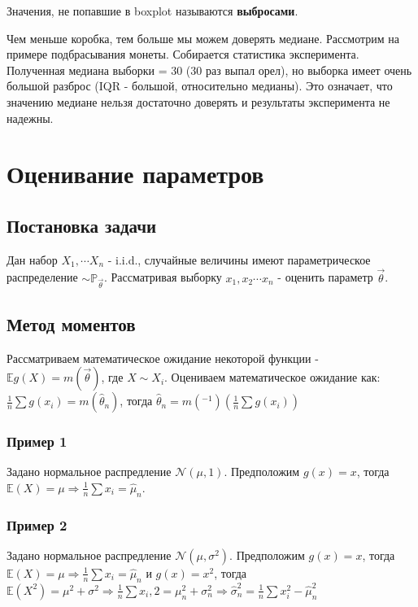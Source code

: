 \documentclass[a4 paper]{article}
\begin{document}
\begin{defin}
Значения, не попавшие в boxplot называются \textbf{выбросами}.
\end{defin}
\begin{remark}
Чем меньше коробка, тем больше мы можем доверять медиане. Рассмотрим на примере подбрасывания монеты. Собирается статистика эксперимента. Полученная медиана выборки = 30 (30 раз выпал орел), но выборка имеет очень большой разброс (IQR - большой, относительно медианы). Это означает, что значению медиане нельзя достаточно доверять и результаты эксперимента не надежны.
\end{remark}

\section{Оценивание параметров}

 \subsection{Постановка задачи}
Дан набор $X_1, \cdots X_n$ - i.i.d., случайные величины имеют параметрическое распределение $\sim \mathbb{P}_{\overrightarrow{\theta}}$. Рассматривая выборку $x_1, x_2 \cdots x_n$ - оценить параметр $\overrightarrow{\theta}$.

\subsection{Метод моментов}
Рассматриваем математическое ожидание некоторой функции - $\mathbb{E}g(X) = m(\overrightarrow{\theta})$, где $X \sim X_i$. Оцениваем математическое ожидание как: $\frac1n \sum g(x_i) = m(\hat{\theta}_n)$, тогда $\hat{\theta}_n = m(^{-1}) (\frac1n \sum g(x_i))$

\subsubsection*{Пример 1}
Задано нормальное распредление $\mathcal{N}(\mu, 1)$. Предположим $g(x) = x$, тогда $\mathbb{E}(X) = \mu \Rightarrow \frac1n \sum x_i = \hat{\mu}_n$.

\subsubsection*{Пример 2}
Задано нормальное распредление $\mathcal{N}(\mu, \sigma^2)$. Предположим $g(x) = x$, тогда $\mathbb{E}(X) = \mu \Rightarrow \frac1n \sum x_i = \hat{\mu}_n$ и $g(x) = x^2$, тогда $\mathbb{E}(X^2) = \mu^2 + \sigma^2 \Rightarrow \frac1n \sum x_i,2 = \mu_n^2 + \sigma_n^2 \Rightarrow \hat{\sigma}_n^2 = \frac1n\sum x_i^2 - \hat{\mu}_n^2$
\end{document}
